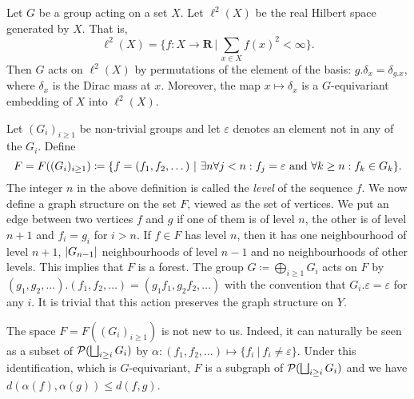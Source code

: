 \begin{exmp}\label{Expl:Hilbert}
Let $G$ be a group acting on a set $X$.
Let $\ell^2(X)$ be the real Hilbert space generated by $X$. That is,
\[\ell^2(X)=\bigg\{f\colon X\to \mathbf R\,\bigg|\, \sum_{x\in X}f(x)^2<\infty\bigg\}.\]
Then $G$ acts on $\ell^2(X)$ by permutations of the element of the basis: $g.\delta_x=\delta_{g.x}$, where $\delta_x$ is the Dirac mass at $x$.
Moreover, the map $x\mapsto \delta_x$ is a  $G$-equivariant embedding of $X$ into $\ell^2(X)$.
\end{exmp}



\begin{exmp}\label{Expl:Forest}
Let $(G_i)_{i\geq 1}$ be non-trivial groups and let $\varepsilon$ denotes an element not in any of the $G_i$.
Define 
\[F=F((G_i)_{i\geq 1})\coloneqq\{f=(f_1,f_2,\dots)\ |\ \exists n\forall j<n: f_j=\varepsilon\textnormal{ and }\forall k\geq n: f_k\in G_k \}.\]
The integer $n$ in the above definition is called the \emph{level} of the sequence $f$.
We now define a graph structure on the set $F$, viewed as the set of vertices.
We put an edge between  two vertices $f$ and $g$ if one of them is of level $n$, the other is of level $n+1$ and $f_i=g_i$ for $i>n$.
If $f\in F$ has level $n$, then it has one neighbourhood of level $n+1$, $\lvert G_{n-1}\rvert$ neighbourhoods of level $n-1$ and no neighbourhoods of other levels.
This implies that $F$ is a forest.
The group $G\coloneqq\bigoplus_{i\geq 1}G_i$ acts on $F$ by $(g_1,g_2,\dots).(f_1,f_2,\dots)=(g_1f_1,g_2f_2,\dots)$ with the convention that $G_i.\varepsilon=\varepsilon$ for any $i$.
It is trivial that this action preserves the graph structure on $Y$.
\end{exmp}
The space $F=F((G_i)_{i\geq 1})$ is not new to us. Indeed, it can naturally be seen as a subset of $\mathcal P(\bigsqcup_{i\geq i}G_i)$ by %
$\alpha\colon (f_1,f_2,\dots)\mapsto \{f_i\ |\ f_i\neq\varepsilon\}$.
Under this identification, which is $G$-equivariant, $F$ is a subgraph of $\mathcal P(\bigsqcup_{i\geq i}G_i)$ and we have $d(\alpha(f),\alpha(g))\leq d(f,g)$.

